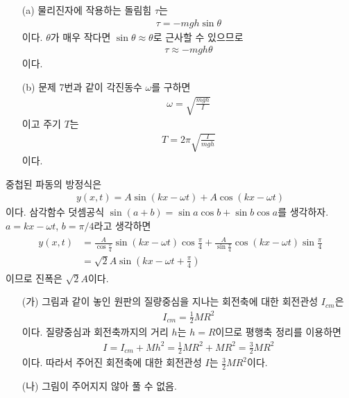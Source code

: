\documentclass[floatfix,nofootinbib,superscriptaddress,fleqn]{revtex4-2}
\begin{document}
\begin{itemize}
  \item[(a)]
  물리진자에 작용하는 돌림힘 $\tau$는
  \begin{align}
    \tau = -mgh\sin\theta
  \end{align}
  이다. $\theta$가 매우 작다면 $\sin\theta\approx\theta$로 근사할 수 있으므로
  \begin{align}
    \tau \approx -mgh\theta
  \end{align}
  이다.
  \item[(b)] 
  문제 7번과 같이 각진동수 $\omega$를 구하면
  \begin{align}
    \omega = \sqrt{\frac{mgh}{I}}
  \end{align}
  이고 주기 $T$는
  \begin{align}
    T = 2\pi\sqrt{\frac{I}{mgh}}
  \end{align}
  이다.
\end{itemize}
\vspace{0.5cm}
 
중첩된 파동의 방정식은
\begin{align}
  y(x,t) = A\sin(kx-\omega t)+A\cos(kx-\omega t)
\end{align}
이다. 삼각함수 덧셈공식 $\sin(a+b) = \sin a\cos b+\sin b\cos a$를 생각하자.
$a = kx-\omega t$, $b= \pi/4$라고 생각하면
\begin{align}
  \begin{split}
    y(x,t) &= \frac{A}{\cos\frac{\pi}{4}}\sin(kx-\omega t)\cos\frac{\pi}{4}
    +\frac{A}{\sin\frac{\pi}{4}}\cos(kx-\omega t)\sin\frac{\pi}{4}  \\
    &=\sqrt{2}A\sin\left(kx-\omega t+\frac{\pi}{4}\right)
  \end{split}
\end{align}
이므로 진폭은 $\sqrt{2}A$이다.

 

\vspace{0.5cm} 
\begin{itemize}
  \item[(가)]
  그림과 같이 놓인 원판의 질량중심을 지나는 회전축에 대한 회전관성 $I_{cm}$은
  \begin{align}
    I_{cm} = \frac{1}{2}MR^2
  \end{align}
  이다. 질량중심과 회전축까지의 거리 $h$는 $h=R$이므로
  평행축 정리를 이용하면
  \begin{align}
    I = I_{cm}+Mh^2=\frac{1}{2}MR^2 + MR^2 = \frac{3}{2}MR^2
  \end{align}
  이다. 따라서 주어진 회전축에 대한 회전관성 $I$는 $\frac{3}{2}MR^2$이다.
  \item[(나)] 
  그림이 주어지지 않아 풀 수 없음. 
\end{itemize}
\end{document}
